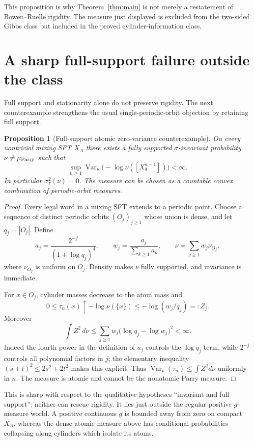\documentclass[11pt]{article}
\newtheorem{proposition}[theorem]{Proposition}
\theoremstyle{definition}
\theoremstyle{remark}
\newcommand{\Var}{\operatorname{Var}}
\begin{document}
This proposition is why Theorem~\ref{thm:main} is not merely a restatement
of Bowen--Ruelle rigidity.  The measure just displayed is excluded from
the two-sided Gibbs class but included in the proved cylinder-information
class.

\section{A sharp full-support failure outside the class}

Full support and stationarity alone do not preserve rigidity.  The next
counterexample strengthens the usual single-periodic-orbit objection by
retaining full support.

\begin{proposition}[Full-support atomic zero-variance counterexample]
On every nontrivial mixing SFT $X_A$ there exists a fully supported
$\sigma$-invariant probability $\nu\ne\mu_{\rm Parry}$ such that
\[
 \sup_{n\ge1}\Var_\nu\bigl(-\log\nu([X_0^{n-1}])\bigr)<\infty.
\]
In particular $\sigma_\tau^2(\nu)=0$.  The measure can be chosen as a
countable convex combination of periodic-orbit measures.
\end{proposition}

\begin{proof}
Every legal word in a mixing SFT extends to a periodic point.  Choose a
sequence of distinct periodic orbits $(O_j)_{j\ge1}$ whose union is dense,
and let $q_j=|O_j|$.  Define
\[
 a_j=\frac{2^{-j}}{(1+\log q_j)^4},\qquad
 w_j=\frac{a_j}{\sum_{k\ge1}a_k},\qquad
 \nu=\sum_{j\ge1}w_j\nu_{O_j},
\]
where $\nu_{O_j}$ is uniform on $O_j$.  Density makes $\nu$ fully
supported, and invariance is immediate.

For $x\in O_j$, cylinder masses decrease to the atom mass and
\[
 0\le\tau_n(x)\uparrow -\log\nu(\{x\})
 \le -\log(w_j/q_j)=:Z_j.
\]
Moreover
\[
 \int Z^2\,d\nu
 \le\sum_{j\ge1}w_j\bigl(\log q_j-\log w_j\bigr)^2<\infty.
\]
Indeed the fourth power in the definition of $a_j$ controls the
$\log q_j$ term, while $2^{-j}$ controls all polynomial factors in $j$;
the elementary inequality $(s+t)^2\le2s^2+2t^2$ makes this explicit.
Thus $\Var_\nu(\tau_n)\le\int Z^2d\nu$ uniformly in $n$.  The measure is
atomic and cannot be the nonatomic Parry measure.
\end{proof}

This is sharp with respect to the qualitative hypotheses ``invariant and
full support'': neither can rescue rigidity.  It lies just outside the
regular positive $g$-measure world.  A positive continuous $g$ is bounded
away from zero on compact $X_A$, whereas the dense atomic measure above
has conditional probabilities collapsing along cylinders which isolate
its atoms.
\end{document}
